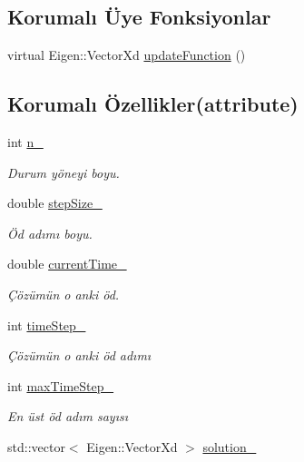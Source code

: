 \subsection*{Korumalı Üye Fonksiyonlar}
\begin{DoxyCompactItemize}
\item 
virtual Eigen\+::\+Vector\+Xd \mbox{\hyperlink{classODE_1_1OdeSolver_a000187013258d0b43ffd8a14486e7ab8}{update\+Function}} ()
\end{DoxyCompactItemize}
\subsection*{Korumalı Özellikler(attribute)}
\begin{DoxyCompactItemize}
\item 
int \mbox{\hyperlink{classODE_1_1OdeSolver_ad9390e79a11b90c8db069c6beabcf490}{n\+\_\+}}
\begin{DoxyCompactList}\small\item\em Durum yöneyi boyu. \end{DoxyCompactList}\item 
double \mbox{\hyperlink{classODE_1_1OdeSolver_a4ffcef8db6eccfb52a0dc75d5bba721b}{step\+Size\+\_\+}}
\begin{DoxyCompactList}\small\item\em Öd adımı boyu. \end{DoxyCompactList}\item 
double \mbox{\hyperlink{classODE_1_1OdeSolver_a936afe9d8e5fef88dfba926a9d7144d2}{current\+Time\+\_\+}}
\begin{DoxyCompactList}\small\item\em Çözümün o anki öd. \end{DoxyCompactList}\item 
int \mbox{\hyperlink{classODE_1_1OdeSolver_a9a3f37006f576b0e7bd056a8e59a0f9e}{time\+Step\+\_\+}}
\begin{DoxyCompactList}\small\item\em Çözümün o anki öd adımı \end{DoxyCompactList}\item 
int \mbox{\hyperlink{classODE_1_1OdeSolver_aa369dcd06b4e9c92c31caa164f95a3fc}{max\+Time\+Step\+\_\+}}
\begin{DoxyCompactList}\small\item\em En üst öd adım sayısı \end{DoxyCompactList}\item 
std\+::vector$<$ Eigen\+::\+Vector\+Xd $>$ \mbox{\hyperlink{classODE_1_1OdeSolver_a47fbd5c42d4b5142f5d3a910a9b86144}{solution\+\_\+}}

\end{DoxyCompactItemize}
